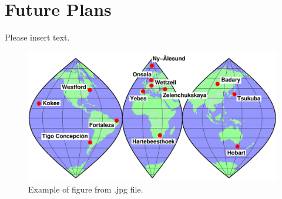 \documentclass[twocolumn,twoside]{svmultivs_br} %
\begin{document}
\section{Future Plans}
%
Please insert text.
%
%
\begin{figure}[htb!]         
  \begin{center}
%
%
  \includegraphics[width=.5\textwidth]{ivs-br-template01.jpg}
  \end{center}
  \caption{Example of figure from .jpg file.}
  \label{first-unique-label}             
\end{figure}                     
%
\end{document}

